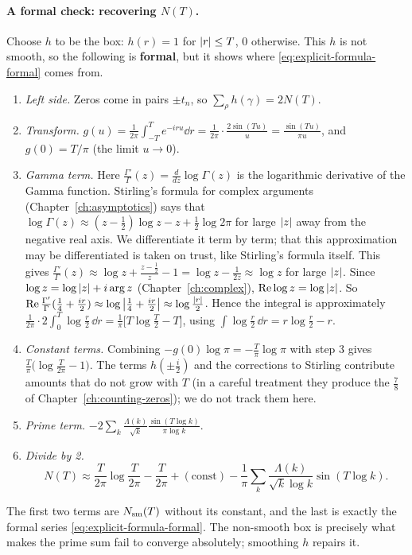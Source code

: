 \paragraph{A formal check: recovering $N(T)$.} Choose $h$ to be the box: $h(r)=1$ for $\left\lvert r\right\rvert\le T$, $0$ otherwise. This $h$ is not smooth, so the following is \textbf{formal}, but it shows where \cref{eq:explicit-formula-formal} comes from.
\begin{enumerate}
\item \emph{Left side.} Zeros come in pairs $\pm t_n$, so $\sum_\rho h(\gamma)=2N(T)$.
\item \emph{Transform.} $g(u)=\frac{1}{2\pi}\int_{-T}^{T}e^{-iru}\dd r=\frac{1}{2\pi}\cdot\frac{2\sin(Tu)}{u}=\frac{\sin(Tu)}{\pi u}$, and $g(0)=T/\pi$ (the limit $u\to0$).
\item \emph{Gamma term.} Here $\frac{\Gamma'}{\Gamma}(z)=\frac{d}{dz}\log\Gamma(z)$ is the logarithmic derivative of the Gamma function. Stirling's formula for complex arguments (Chapter~\ref{ch:asymptotics}) says that $\log\Gamma(z)\approx(z-\tfrac12)\log z-z+\tfrac12\log2\pi$ for large $\left\lvert z\right\rvert$ away from the negative real axis. We differentiate it term by term; that this approximation may be differentiated is taken on trust, like Stirling's formula itself. This gives $\frac{\Gamma'}{\Gamma}(z)\approx\log z+\frac{z-\frac12}{z}-1=\log z-\frac{1}{2z}\approx\log z$ for large $\left\lvert z\right\rvert$. Since $\log z=\log\left\lvert z\right\rvert+i\arg z$ (Chapter~\ref{ch:complex}), $\operatorname{Re}\log z=\log\left\lvert z\right\rvert$. So $\operatorname{Re}\frac{\Gamma'}{\Gamma}(\frac14+\frac{ir}{2})\approx\log\left\lvert \tfrac14+\tfrac{ir}2\right\rvert\approx\log\frac{\left\lvert r\right\rvert}{2}$. Hence the integral is approximately $\frac{1}{2\pi}\cdot2\int_0^T\log\frac r2\,\dd r=\frac1\pi\bigl[T\log\frac T2-T\bigr]$, using $\int\log\frac r2\,\dd r=r\log\frac r2-r$.
\item \emph{Constant terms.} Combining $-g(0)\log\pi=-\frac{T}{\pi}\log\pi$ with step 3 gives $\frac T\pi\bigl(\log\frac{T}{2\pi}-1\bigr)$. The terms $h(\pm\frac i2)$ and the corrections to Stirling contribute amounts that do not grow with $T$ (in a careful treatment they produce the $\frac78$ of Chapter~\ref{ch:counting-zeros}); we do not track them here.
\item \emph{Prime term.} $-2\sum_k\frac{\Lambda(k)}{\sqrt k}\frac{\sin(T\log k)}{\pi\log k}$.
\item \emph{Divide by 2.}
\[
N(T)\approx\frac{T}{2\pi}\log\frac{T}{2\pi}-\frac{T}{2\pi}+(\text{const})-\frac{1}{\pi}\sum_{k}\frac{\Lambda(k)}{\sqrt k\log k}\sin(T\log k).
\]
\end{enumerate}
The first two terms are $N_{\mathrm{sm}}(T)$ without its constant, and the last is exactly the formal series \cref{eq:explicit-formula-formal}. The non-smooth box is precisely what makes the prime sum fail to converge absolutely; smoothing $h$ repairs it.

